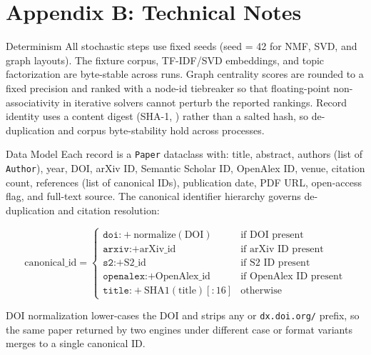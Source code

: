 \documentclass[
  ignorenonframetext,
]{beamer}
\author{}
\date{}
\begin{document}
\section{Appendix B: Technical Notes}\label{appendix-b-technical-notes}

\begin{frame}{Determinism}
\label{determinism}
All stochastic steps use fixed seeds (seed = 42 for NMF, SVD, and graph
layouts). The fixture corpus, TF-IDF/SVD embeddings, and topic
factorization are byte-stable across runs. Graph centrality scores are
rounded to a fixed precision and ranked with a node-id tiebreaker so
that floating-point non-associativity in iterative solvers cannot
perturb the reported rankings. Record identity uses a content digest
(SHA-1, ) rather than a salted hash, so
de-duplication and corpus byte-stability hold across processes.
\end{frame}

\begin{frame}{Data Model}
\label{data-model}
Each record is a \texttt{Paper} dataclass with: title, abstract, authors
(list of \texttt{Author}), year, DOI, arXiv ID, Semantic Scholar ID,
OpenAlex ID, venue, citation count, references (list of canonical IDs),
publication date, PDF URL, open-access flag, and full-text source. The
canonical identifier hierarchy governs de-duplication and citation
resolution:

\[
\text{canonical\_id} = \begin{cases}
\texttt{doi:} + \text{normalize}(\text{DOI}) & \text{if DOI present} \\
\texttt{arxiv:} + \text{arXiv\_id} & \text{if arXiv ID present} \\
\texttt{s2:} + \text{S2\_id} & \text{if S2 ID present} \\
\texttt{openalex:} + \text{OpenAlex\_id} & \text{if OpenAlex ID present} \\
\texttt{title:} + \text{SHA1}(\text{title})[:16] & \text{otherwise}
\end{cases}
\]

DOI normalization lower-cases the DOI and strips any
 or \texttt{dx.doi.org/} prefix, so the same
paper returned by two engines under different case or format variants
merges to a single canonical ID.
\end{frame}
\end{document}
